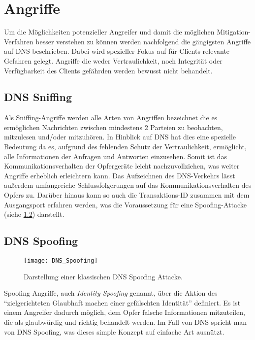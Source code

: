 \chapter{Angriffe}
\label{chap:attacks}
Um die Möglichkeiten potenzieller Angreifer und damit die möglichen Mitigation-Verfahren besser verstehen zu können werden nachfolgend die gängigsten Angriffe auf DNS beschrieben. Dabei wird spezieller Fokus auf für Clients relevante Gefahren gelegt. Angriffe die weder Vertraulichkeit, noch Integrität oder Verfügbarkeit des Clients gefährden werden bewusst nicht behandelt.

\section{DNS Sniffing}
\label{sec:attacks-dnssniffing}
Als Sniffing-Angriffe werden alle Arten von Angriffen bezeichnet die es ermöglichen Nachrichten zwischen mindestens 2 Parteien zu beobachten, mitzulesen und/oder mitzuhören\cite{CAPEC157}. In Hinblick auf DNS hat dies eine spezielle Bedeutung da es, aufgrund des fehlenden Schutz der Vertraulichkeit, ermöglicht, alle Informationen der Anfragen und Antworten einzusehen. Somit ist das Kommunikationsverhalten der Opfergeräte leicht nachzuvollziehen, was weiter Angriffe erheblich erleichtern kann. Das Aufzeichnen des DNS-Verkehrs lässt außerdem umfangreiche Schlussfolgerungen auf das Kommunikationsverhalten des Opfers zu. Darüber hinaus kann so auch die Transaktions-ID zusammen mit dem Ausgangsport erfahren werden, was die Voraussetzung für eine Spoofing-Attacke (siehe \ref{sec:attacks-dnsspoofing}) darstellt. 

\section{DNS Spoofing}
\label{sec:attacks-dnsspoofing}
\begin{wrapfigure}{r}{0.5\textwidth}
    \begin{center}
        \texttt{[image: DNS\_Spoofing]}
    \end{center}
    \caption{Darstellung einer klassischen DNS Spoofing Attacke.}
    \label{img:dnsspoofing}
\end{wrapfigure}

Spoofing Angriffe, auch \textit{Identity Spoofing} genannt, über die Aktion des ``zielgerichteten Glaubhaft machen einer gefälschten Identität'' definiert\cite{CAPEC151}. Es ist einem Angreifer dadurch möglich, dem Opfer falsche Informationen mitzuteilen, die als glaubwürdig und richtig behandelt werden. Im Fall von DNS spricht man von DNS Spoofing, was dieses simple Konzept auf einfache Art ausnützt.

